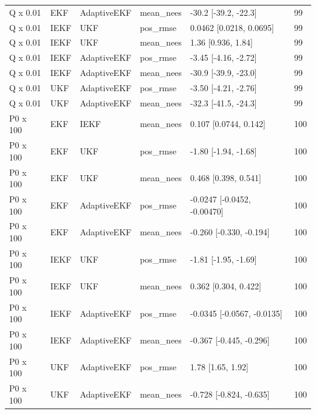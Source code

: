 {\begin{longtable}{llllll}
Q x 0.01 & EKF & AdaptiveEKF & mean\_nees & -30.2 [-39.2, -22.3] & 99 \\
Q x 0.01 & IEKF & UKF & pos\_rmse & 0.0462 [0.0218, 0.0695] & 99 \\
Q x 0.01 & IEKF & UKF & mean\_nees & 1.36 [0.936, 1.84] & 99 \\
Q x 0.01 & IEKF & AdaptiveEKF & pos\_rmse & -3.45 [-4.16, -2.72] & 99 \\
Q x 0.01 & IEKF & AdaptiveEKF & mean\_nees & -30.9 [-39.9, -23.0] & 99 \\
Q x 0.01 & UKF & AdaptiveEKF & pos\_rmse & -3.50 [-4.21, -2.76] & 99 \\
Q x 0.01 & UKF & AdaptiveEKF & mean\_nees & -32.3 [-41.5, -24.3] & 99 \\
P0 x 100 & EKF & IEKF & mean\_nees & 0.107 [0.0744, 0.142] & 100 \\
P0 x 100 & EKF & UKF & pos\_rmse & -1.80 [-1.94, -1.68] & 100 \\
P0 x 100 & EKF & UKF & mean\_nees & 0.468 [0.398, 0.541] & 100 \\
P0 x 100 & EKF & AdaptiveEKF & pos\_rmse & -0.0247 [-0.0452, -0.00470] & 100 \\
P0 x 100 & EKF & AdaptiveEKF & mean\_nees & -0.260 [-0.330, -0.194] & 100 \\
P0 x 100 & IEKF & UKF & pos\_rmse & -1.81 [-1.95, -1.69] & 100 \\
P0 x 100 & IEKF & UKF & mean\_nees & 0.362 [0.304, 0.422] & 100 \\
P0 x 100 & IEKF & AdaptiveEKF & pos\_rmse & -0.0345 [-0.0567, -0.0135] & 100 \\
P0 x 100 & IEKF & AdaptiveEKF & mean\_nees & -0.367 [-0.445, -0.296] & 100 \\
P0 x 100 & UKF & AdaptiveEKF & pos\_rmse & 1.78 [1.65, 1.92] & 100 \\
P0 x 100 & UKF & AdaptiveEKF & mean\_nees & -0.728 [-0.824, -0.635] & 100 \\
\bottomrule
\end{longtable}
}
